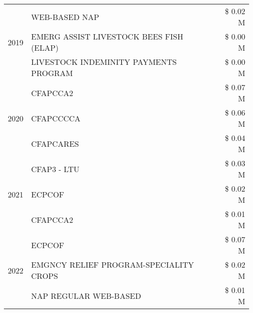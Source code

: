 \begin{tabular}{llr}
\cline{1-3}
\multirow[t]{3}{*}{2019} & WEB-BASED NAP & \$ 0.02 M \\
 & EMERG ASSIST LIVESTOCK BEES FISH (ELAP) & \$ 0.00 M \\
 & LIVESTOCK INDEMINITY PAYMENTS PROGRAM & \$ 0.00 M \\
\cline{1-3}
\multirow[t]{3}{*}{2020} & CFAPCCA2 & \$ 0.07 M \\
 & CFAPCCCCA & \$ 0.06 M \\
 & CFAPCARES & \$ 0.04 M \\
\cline{1-3}
\multirow[t]{3}{*}{2021} & CFAP3 - LTU & \$ 0.03 M \\
 & ECPCOF & \$ 0.02 M \\
 & CFAPCCA2 & \$ 0.01 M \\
\cline{1-3}
\multirow[t]{3}{*}{2022} & ECPCOF & \$ 0.07 M \\
 & EMGNCY RELIEF PROGRAM-SPECIALITY CROPS & \$ 0.02 M \\
 & NAP REGULAR WEB-BASED & \$ 0.01 M \\
\cline{1-3}
\bottomrule
\end{tabular}
